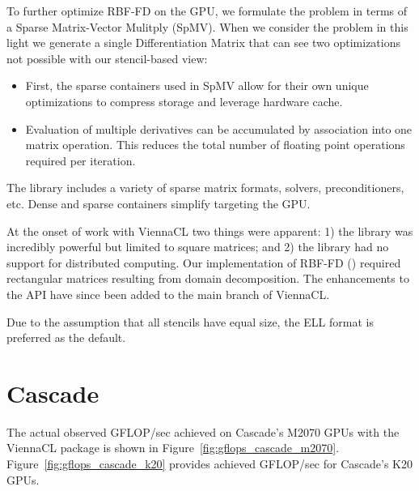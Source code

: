 \documentclass{report}
\begin{document}
To further optimize RBF-FD on the GPU, we formulate the problem in terms of a Sparse Matrix-Vector Mulitply (SpMV). When we consider the problem in this light we generate a single Differentiation Matrix that can see two optimizations not possible with our stencil-based view: 
\begin{itemize} 
\item First, the sparse containers used in SpMV allow for their own unique optimizations to compress storage and leverage hardware cache.
\item Evaluation of multiple derivatives can be accumulated by association into one matrix operation. This reduces the total number of floating point operations required per iteration. 
\end{itemize}


The library includes a variety of sparse matrix formats, solvers, preconditioners, etc. Dense and sparse containers simplify targeting the GPU. 

At the onset of work with ViennaCL two things were apparent: 1) the library was incredibly powerful but limited to square matrices; and 2) the library had no support for distributed computing. Our implementation of RBF-FD (\cite{BolligRBFFDCode}) required rectangular matrices resulting from domain decomposition. The enhancements to the API have since been added to the main branch of ViennaCL. 









Due to the assumption that all stencils have equal size, the ELL format is preferred as the default. 
 

\section{Cascade}

The actual observed GFLOP/sec achieved on Cascade's M2070 GPUs with the ViennaCL package is shown in Figure~\ref{fig:gflops_cascade_m2070}. Figure~\ref{fig:gflops_cascade_k20} provides achieved GFLOP/sec for Cascade's K20 GPUs.  
\end{document}
